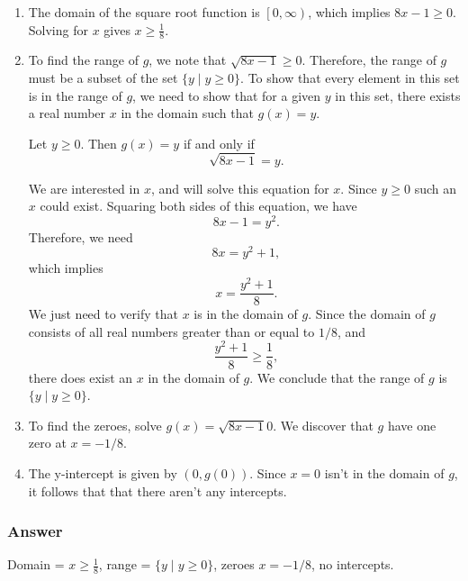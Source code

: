 \documentclass[11pt, letterpaper, oneside]{memoir}
\begin{document}
\begin{enumerate}[label=\roman*]

  \item
    The domain of the square root function is $ \left[ 0, \infty \right) $, which implies $ 8x - 1 \ge 0 $. Solving for $ x $ gives $ x \ge \frac{1}{8} $.

  \item
    To find the range of $ g $, we note that $ \sqrt{8x - 1} \ge 0 $. Therefore, the range of $ g $ must be a subset of the set $ \{y \mid y \ge 0\} $. To show that every element in this set is in the range of $ g $, we need to show that for a given $ y $ in this set, there exists a real number $ x $ in the domain such that $ g(x) = y $.

    Let $ y \ge 0 $. Then $ g(x) = y $ if and only if
    $$ \phantom{.}
    \sqrt{8x - 1} = y
    .$$

    We are interested in $ x $, and will solve this equation for $ x $. Since $ y \ge 0 $ such an $ x $ could exist. Squaring both sides of this equation, we have
    $$ \phantom{.}
    {8x - 1} = y^2
    .$$
    Therefore, we need
    $$ \phantom{.}
    8x = y^2 + 1
    ,$$
    which implies
    $$ \phantom{.}
    x = \frac{y^2 + 1}{8}
    .$$
    We just need to verify that $ x $ is in the domain of $ g $. Since the domain of $ g $ consists of all real numbers greater than or equal to $ 1 / 8 $, and
    $$ \phantom{.}
    \frac{y^2 + 1}{8} \ge \frac{1}{8}
    ,$$
    there does exist an $ x $ in the domain of $ g $. We conclude that the range of $ g $ is $ \{ y \mid y \ge 0 \} $.

  \item
    To find the zeroes, solve $ g(x) = \sqrt{8x - 1}0 $. We discover that $ g $ have one zero at $ x = -1/8 $.

  \item The y-intercept is given by $ (0, g(0)) $. Since $ x = 0 $ isn't in the domain of $ g $, it follows that that there aren't any intercepts.

\end{enumerate}

\subsubsection{Answer}

Domain = $ x \ge \frac{1}{8} $, range = $ \{ y \mid y \ge 0 \} $, zeroes $ x = -1/8 $, no intercepts.








\end{document}
